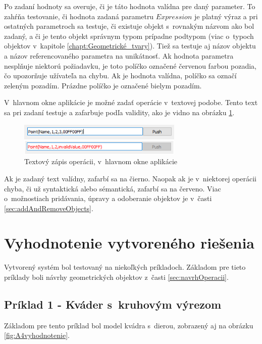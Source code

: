 Po zadaní hodnoty sa overuje, či je táto hodnota valídna pre daný parameter. To zahŕňa testovanie, či hodnota zadaná parametru $Expression$ je platný výraz a pri ostatných parametroch sa testuje, či existuje objekt s~rovnakým názvom ako bol zadaný, a či je tento objekt správnym typom prípadne podtypom (viac o~typoch objektov v~kapitole  \ref{chapt:Geometrické_tvary}). Tiež sa testuje aj názov objektu a názov referencovaného parametra na unikátnosť.
Ak hodnota parametra nesplňuje niektorú požiadavku, je toto políčko označené červenou farbou pozadia, čo upozorňuje užívateľa na chybu. Ak je hodnota valídna, políčko sa označí zeleným pozadím. Prázdne políčko je označené bielym pozadím. 

V~hlavnom okne aplikácie je možné zadať operácie v~textovej podobe. Tento text sa pri zadaní testuje a zafarbuje podľa validity, ako je vidno na obrázku \ref{fig:text}. 
\begin{figure}[H]
	\centering
	\includegraphics[width=0.7\textwidth]{obrazky-figures/operations text.png}
	\caption{Textový zápis operácii, v~hlavnom okne aplikácie}
	\label{fig:text}
\end{figure}
Ak je zadaný text valídny, zafarbí sa na čierno. Naopak ak je v~niektorej operácii chyba, či už syntaktická alebo sémantická, zafarbí sa na červeno. Viac o~možnostiach pridávania, úpravy a odoberanie objektov je v~časti \ref{sec:addAndRemoveObjects}.





\chapter{Vyhodnotenie vytvoreného riešenia}\label{sec:zhodnotenie}

Vytvorený systém bol testovaný na niekoľkých príkladoch. Základom pre tieto príklady boli návrhy geometrických objektov z~časti \ref{sec:navrhOperacii}.

\section*{Príklad 1 - Kváder s~kruhovým výrezom}
Základom pre tento príklad bol model kvádra s~dierou, zobrazený aj na obrázku \ref{fig:A4vyhodnotenie}.

